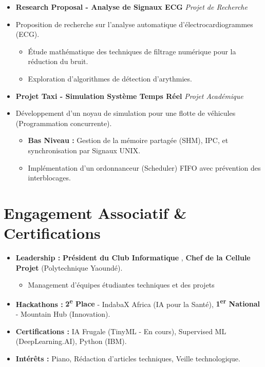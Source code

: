 \documentclass[a4paper,11pt]{article}
\begin{document}
\begin{itemize}[leftmargin=*, label={}]
\item \textbf{Research Proposal - Analyse de Signaux ECG} \hfill \textit{Projet de Recherche}
\vspace{-2pt}
\item \small{Proposition de recherche sur l'analyse automatique d'électrocardiogrammes (ECG).}
    \begin{itemize}[leftmargin=0.4cm, nosep, label=\tiny$\bullet$]
        \item \small{Étude mathématique des techniques de filtrage numérique pour la réduction du bruit.}
        \item \small{Exploration d'algorithmes de détection d'arythmies.}
    \end{itemize}
    \vspace{1pt}
\item \textbf{Projet Taxi - Simulation Système Temps Réel} \hfill \textit{Projet Académique}
\vspace{-2pt}
\item \small{Développement d'un noyau de simulation pour une flotte de véhicules (Programmation concurrente).}
    \begin{itemize}[leftmargin=0.4cm, nosep, label=\tiny$\bullet$]
        \item \small{\textbf{Bas Niveau :} Gestion de la mémoire partagée (SHM), IPC, et synchronisation par Signaux UNIX.}
        \item \small{Implémentation d'un ordonnanceur (Scheduler) FIFO avec prévention des interblocages.}
    \end{itemize}
    \vspace{1pt}

\end{itemize}

\section{Engagement Associatif \& Certifications}
\begin{itemize}[leftmargin=*, nosep]
    \item \textbf{Leadership :} \textbf{Président du Club Informatique} , \textbf{Chef de la Cellule Projet} (Polytechnique Yaoundé).
    \begin{itemize}[leftmargin=0.4cm, nosep, label=\tiny$\bullet$]
         \item \small{Management d'équipes étudiantes techniques et des projets}
    \end{itemize}
    \item \textbf{Hackathons :} \textbf{2\textsuperscript{e} Place} - IndabaX Africa (IA pour la Santé), \textbf{1\textsuperscript{er} National } - Mountain Hub (Innovation).
    \item \textbf{Certifications :} IA Frugale (TinyML - En cours), Supervised ML (DeepLearning.AI), Python (IBM).
    \item \textbf{Intérêts :} Piano, Rédaction d'articles techniques, Veille technologique.
\end{itemize}
\end{document}
